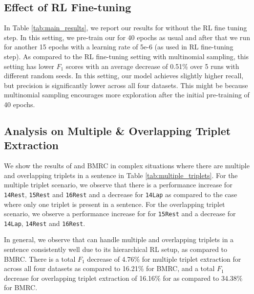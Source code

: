 \documentclass[sigconf]{acmart}
\begin{document}
\subsection{Effect of RL Fine-tuning}

In Table \ref{tab:main_results}, we report our results for \mymodel{} without the RL fine tuning step. In this setting, we pre-train our \mymodel{} for 40 epochs as usual and after that we run for another 15 epochs with a learning rate of 5e-6 (as used in RL fine-tuning step). As compared to the RL fine-tuning setting with multinomial sampling, this setting has lower $F_1$ scores with an average decrease of 0.51\% over 5 runs with different random seeds. In this setting, our model achieves slightly higher recall, but precision is significantly lower across all four datasets. This might be because multinomial sampling encourages more exploration after the initial pre-training of 40 epochs.

\vspace{-1em}
\subsection{Analysis on Multiple \& Overlapping Triplet Extraction}



We show the results of \mymodel{} and BMRC in complex situations where there are multiple and overlapping triplets in a sentence in Table \ref{tab:multiple_triplets}. For the multiple triplet scenario, we observe that there is a performance increase for \texttt{14Rest}, \texttt{15Rest} and \texttt{16Rest} and a decrease for \texttt{14Lap} as compared to the case where only one triplet is present in a sentence. For the overlapping triplet scenario, we observe a performance increase for for \texttt{15Rest} and a decrease for \texttt{14Lap}, \texttt{14Rest} and \texttt{16Rest}.

In general, we observe that \mymodel{} can handle multiple and overlapping triplets in a sentence consistently well due to its hierarchical RL setup, as compared to BMRC. There is a total $F_1$ decrease of 4.76\% for multiple triplet extraction for \mymodel{} across all four datasets as compared to 16.21\% for BMRC, and a total $F_1$ decrease for overlapping triplet extraction of 16.16\% for \mymodel{} as compared to 34.38\% for BMRC. 

\vspace{-0.7em}
\end{document}
